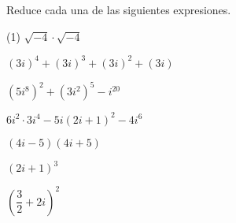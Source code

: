 \documentclass[]{srs}
\begin{document}
Reduce cada una de las siguientes expresiones.
\begin{preguntas}(1)
  \pregunta $\sqrt{-4}\cdot\sqrt{-4}$
  \begin{malla}[height=8cm]
  \end{malla}
  \pregunta $\left(3i\right)^4 + \left(3i\right)^3 + \left(3i\right)^2 + \left(3i\right)$
  \begin{malla}[height=8cm]
  \end{malla}
  \pregunta $\left(5i^8\right)^2 + \left(3i^2\right)^5 - i^{20}$
  \begin{malla}[height=8cm]
  \end{malla}
  \pregunta $6i^2\cdot 3i^4 -5i\left(2i+1\right)^2 - 4i^6$
  \begin{malla}[height=8cm]
  \end{malla}
  \pregunta $\left(4i-5\right)\left(4i+5\right)$
  \begin{malla}[height=8cm]
  \end{malla}
  \pregunta $(2i+1)^3$
  \begin{malla}[height=8cm]
  \end{malla}
  \pregunta $\left(\dfrac{3}{2} + 2i\right)^2$
  \begin{malla}[height=8cm]
  \end{malla}
\end{preguntas}
\end{document}
